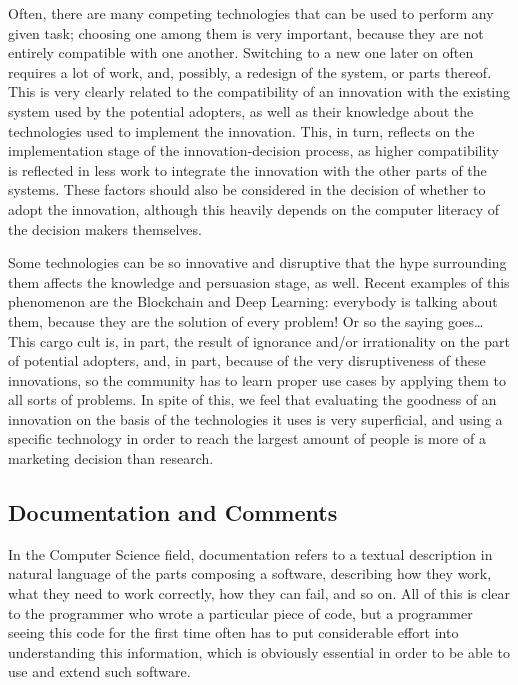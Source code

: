 \documentclass[12pt]{article}
\begin{document}
Often, there are many competing technologies that can be used to perform any given task; choosing one among them is very important, because they are not entirely compatible with one another. Switching to a new one later on often requires a lot of work, and, possibly, a redesign of the system, or parts thereof. This is very clearly related to the compatibility of an innovation with the existing system used by the potential adopters, as well as their knowledge about the technologies used to implement the innovation. This, in turn, reflects on the implementation stage of the innovation-decision process, as higher compatibility is reflected in less work to integrate the innovation with the other parts of the systems. These factors should also be considered in the decision of whether to adopt the innovation, although this heavily depends on the computer literacy of the decision makers themselves.

Some technologies can be so innovative and disruptive that the hype surrounding them affects the knowledge and persuasion stage, as well. Recent examples of this phenomenon are the Blockchain and Deep Learning: everybody is talking about them, because they are the solution of every problem! Or so the saying goes\ldots{} This cargo cult is, in part, the result of ignorance and/or irrationality on the part of potential adopters, and, in part, because of the very disruptiveness of these innovations, so the community has to learn proper use cases by applying them to all sorts of problems. In spite of this, we feel that evaluating the goodness of an innovation on the basis of the technologies it uses is very superficial, and using a specific technology in order to reach the largest amount of people is more of a marketing decision than research.


\subsection{Documentation and Comments}
\label{sec:org8c99edb}
In the Computer Science field, documentation refers to a textual description in natural language of the parts composing a software, describing how they work, what they need to work correctly, how they can fail, and so on. All of this is clear to the programmer who wrote a particular piece of code, but a programmer seeing this code for the first time often has to put considerable effort into understanding this information, which is obviously essential in order to be able to use and extend such software.
\end{document}
